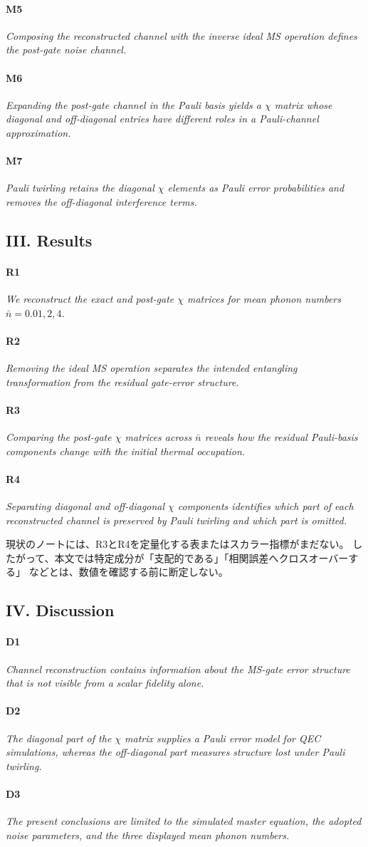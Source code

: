 \documentclass[dvipdfmx,a4paper,11pt]{jsarticle}
\newcommand{\topicsentence}[2]{%
  \paragraph{#1}\textit{#2}\par
}
\begin{document}
\topicsentence{M5}{Composing the reconstructed channel with the inverse ideal MS operation defines the post-gate noise channel.}

\topicsentence{M6}{Expanding the post-gate channel in the Pauli basis yields a $\chi$ matrix whose diagonal and off-diagonal entries have different roles in a Pauli-channel approximation.}

\topicsentence{M7}{Pauli twirling retains the diagonal $\chi$ elements as Pauli error probabilities and removes the off-diagonal interference terms.}

\subsection{III. Results}

\topicsentence{R1}{We reconstruct the exact and post-gate $\chi$ matrices for mean phonon numbers $\bar{n}=0.01,2,4$.}

\topicsentence{R2}{Removing the ideal MS operation separates the intended entangling transformation from the residual gate-error structure.}

\topicsentence{R3}{Comparing the post-gate $\chi$ matrices across $\bar{n}$ reveals how the residual Pauli-basis components change with the initial thermal occupation.}

\topicsentence{R4}{Separating diagonal and off-diagonal $\chi$ components identifies which part of each reconstructed channel is preserved by Pauli twirling and which part is omitted.}

現状のノートには、R3とR4を定量化する表またはスカラー指標がまだない。
したがって、本文では特定成分が「支配的である」「相関誤差へクロスオーバーする」
などとは、数値を確認する前に断定しない。

\subsection{IV. Discussion}

\topicsentence{D1}{Channel reconstruction contains information about the MS-gate error structure that is not visible from a scalar fidelity alone.}

\topicsentence{D2}{The diagonal part of the $\chi$ matrix supplies a Pauli error model for QEC simulations, whereas the off-diagonal part measures structure lost under Pauli twirling.}

\topicsentence{D3}{The present conclusions are limited to the simulated master equation, the adopted noise parameters, and the three displayed mean phonon numbers.}
\end{document}
